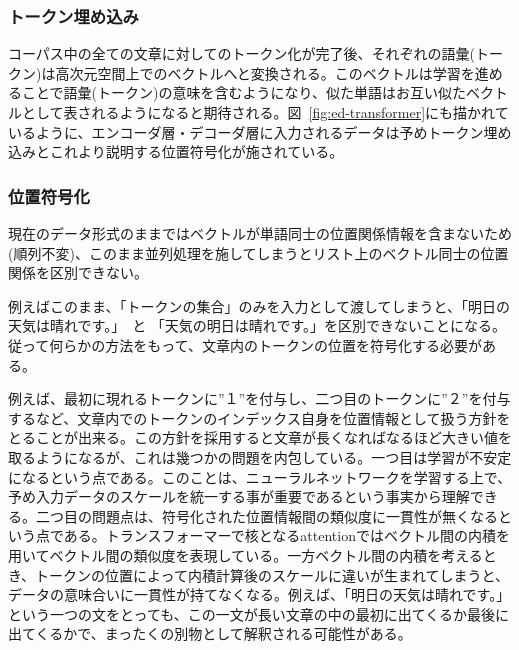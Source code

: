 \vspace{5mm}

\subsubsection{トークン埋め込み}
コーパス中の全ての文章に対してのトークン化が完了後、それぞれの語彙(トークン)は高次元空間上でのベクトルへと変換される。このベクトルは学習を進めることで語彙(トークン)の意味を含むようになり、似た単語はお互い似たベクトルとして表されるようになると期待される。図~\ref{fig:ed-transformer}にも描かれているように、エンコーダ層・デコーダ層に入力されるデータは予めトークン埋め込みとこれより説明する位置符号化が施されている。
\subsubsection{位置符号化}



現在のデータ形式のままではベクトルが単語同士の位置関係情報を含まないため(順列不変)、このまま並列処理を施してしまうとリスト上のベクトル同士の位置関係を区別できない。　

例えばこのまま、「トークンの集合」のみを入力として渡してしまうと、「明日の天気は晴れです。」　と 「天気の明日は晴れです。」を区別できないことになる。従って何らかの方法をもって、文章内のトークンの位置を符号化する必要がある。

例えば、最初に現れるトークンに”１”を付与し、二つ目のトークンに”２”を付与するなど、文章内でのトークンのインデックス自身を位置情報として扱う方針をとることが出来る。この方針を採用すると文章が長くなればなるほど大きい値を取るようになるが、これは幾つかの問題を内包している。一つ目は学習が不安定になるという点である。このことは、ニューラルネットワークを学習する上で、予め入力データのスケールを統一する事が重要であるという事実から理解できる。二つ目の問題点は、符号化された位置情報間の類似度に一貫性が無くなるという点である。トランスフォーマーで核となるattentionではベクトル間の内積を用いてベクトル間の類似度を表現している。一方ベクトル間の内積を考えるとき、トークンの位置によって内積計算後のスケールに違いが生まれてしまうと、データの意味合いに一貫性が持てなくなる。例えば、「明日の天気は晴れです。」という一つの文をとっても、この一文が長い文章の中の最初に出てくるか最後に出てくるかで、まったくの別物として解釈される可能性がある。

